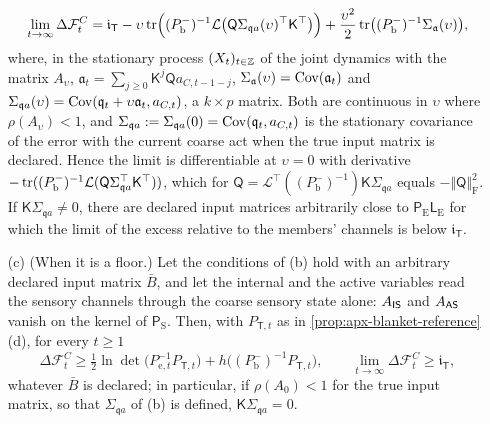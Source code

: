\begin{proposition}
\begin{enumerate}
\begin{equation}\label{eq:apx-blanket-input}
\lim_{t\to\infty}\Delta\mathcal F^C_t=\mathfrak i_{\mathsf T}-\upsilon\tr\Bigl((P^-_{\mathrm b})^{-1}\mathcal L\bigl(\mathsf Q\Sigma_{\mathfrak qa}(\upsilon)^\top\mathsf K^\top\bigr)\Bigr)+\frac{\upsilon^2}2\tr\bigl((P^-_{\mathrm b})^{-1}\Sigma_{\mathfrak a}(\upsilon)\bigr),
\end{equation}
where, in the stationary process $(X_t)_{t\in\Z}$ of the joint dynamics with the matrix $A_\upsilon$, $\mathfrak a_t=\sum_{j\ge0}\mathsf K^j\mathsf Qa_{C,t-1-j}$, $\Sigma_{\mathfrak a}(\upsilon)=\Cov(\mathfrak a_t)$ and $\Sigma_{\mathfrak qa}(\upsilon)=\Cov(\mathfrak q_t+\upsilon\mathfrak a_t,a_{C,t})$, a $k\times p$ matrix. Both are continuous in $\upsilon$ where $\rho(A_\upsilon)<1$, and $\Sigma_{\mathfrak qa}:=\Sigma_{\mathfrak qa}(0)=\Cov(\mathfrak q_t,a_{C,t})$ is the stationary covariance of the error with the current coarse act when the true input matrix is declared. Hence the limit is differentiable at $\upsilon=0$ with derivative $-\tr((P^-_{\mathrm b})^{-1}\mathcal L(\mathsf Q\Sigma_{\mathfrak qa}^\top\mathsf K^\top))$, which for $\mathsf Q=\mathcal L^\top((P^-_{\mathrm b})^{-1})\mathsf K\Sigma_{\mathfrak qa}$ equals $-\Vert\mathsf Q\Vert_{\mathrm F}^2$. If $\mathsf K\Sigma_{\mathfrak qa}\ne0$, there are declared input matrices arbitrarily close to $\mathsf P_{\mathrm E}\mathsf L_{\mathrm E}$ for which the limit of the excess relative to the members' channels is below $\mathfrak i_{\mathsf T}$.
\item[(c)] (When it is a floor.) Let the conditions of (b) hold with an arbitrary declared input matrix $\bar B$, and let the internal and the active variables read the sensory channels through the coarse sensory state alone: $A_{\mathsf{I}\mathsf{S}}$ and $A_{\mathsf{A}\mathsf{S}}$ vanish on the kernel of $\mathsf P_{\mathrm S}$. Then, with $P_{\mathsf T,t}$ as in \cref{prop:apx-blanket-reference}(d), for every $t\ge1$
\begin{equation}\label{eq:apx-blanket-floor}
\Delta\mathcal F^C_t\ge\tfrac12\ln\det\bigl(P_{\mathrm e,t}^{-1}P_{\mathsf T,t}\bigr)+h\bigl((P^-_{\mathrm b})^{-1}P_{\mathsf T,t}\bigr),\qquad\lim_{t\to\infty}\Delta\mathcal F^C_t\ge\mathfrak i_{\mathsf T},
\end{equation}
whatever $\bar B$ is declared; in particular, if $\rho(A_0)<1$ for the true input matrix, so that $\Sigma_{\mathfrak qa}$ of (b) is defined, $\mathsf K\Sigma_{\mathfrak qa}=0$.
\end{enumerate}
\end{proposition}

